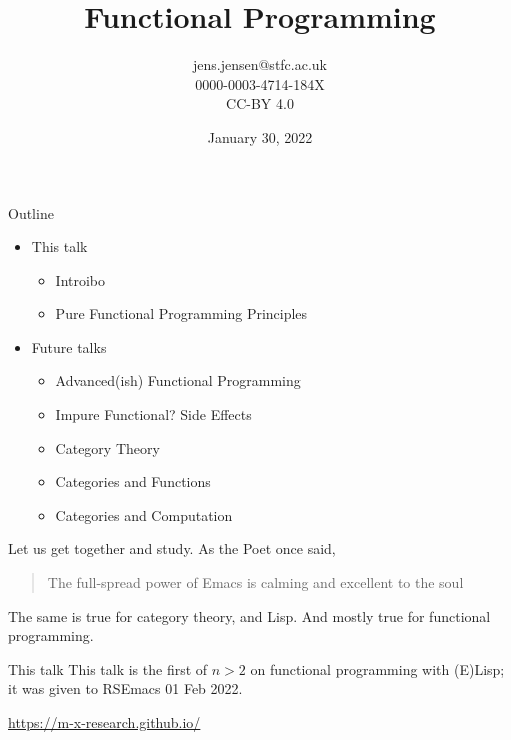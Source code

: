 \documentclass[presentation]{beamer}
\author{jens.jensen@stfc.ac.uk \\0000-0003-4714-184X\\CC-BY 4.0}
\date{January 30, 2022}
\title{Functional Programming}
\begin{document}
\maketitle
\begin{frame}{Outline}

  \begin{itemize}
    \item This talk
    \begin{itemize}
\item Introibo
\item Pure Functional Programming Principles
    \end{itemize}
  \item Future talks
    \begin{itemize}
  \item Advanced(ish) Functional Programming
\item Impure Functional? Side Effects
\item Category Theory
\item Categories and Functions
\item Categories and Computation
    \end{itemize}
\end{itemize}

\end{frame}




\begin{frame}
  Let us get together and study.  As the Poet once said,
  \begin{quote}
The full-spread power of Emacs is calming and excellent to the soul
  \end{quote}
The same is true for category theory, and Lisp.  And mostly true for functional programming.
\end{frame}

\begin{frame}{This talk}
  This talk is the first of $n>2$ on functional programming with (E)Lisp; it was given to RSEmacs
  01 Feb 2022.

   \url{https://m-x-research.github.io/}
\end{frame}
\end{document}
